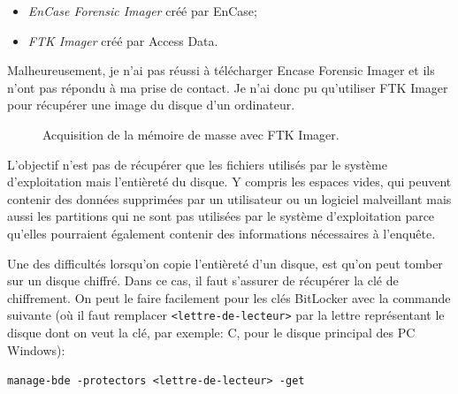 \begin{itemize}
    \item \textit{EnCase Forensic Imager} créé par EnCase;
    \item \textit{FTK Imager} créé par Access Data.
\end{itemize}

Malheureusement, je n'ai pas réussi à télécharger Encase Forensic Imager et ils n'ont pas répondu à ma prise de contact. Je n'ai donc pu qu'utiliser FTK Imager pour récupérer une image du disque d'un ordinateur.

\begin{figure}
    \centering
    \caption{Acquisition de la mémoire de masse avec FTK Imager.}
    \label{fig:ftk-imager}
\end{figure}

L'objectif n'est pas de récupérer que les fichiers utilisés par le système d'exploitation mais l'entièreté du disque. Y compris les espaces vides, qui peuvent contenir des données supprimées par un utilisateur ou un logiciel malveillant mais aussi les partitions qui ne sont pas utilisées par le système d'exploitation parce qu'elles pourraient également contenir des informations nécessaires à l'enquête.

Une des difficultés lorsqu'on copie l'entièreté d'un disque, est qu'on peut tomber sur un disque chiffré. Dans ce cas, il faut s'assurer de récupérer la clé de chiffrement. On peut le faire facilement pour les clés BitLocker avec la commande suivante (où il faut remplacer \texttt{<lettre-de-lecteur>} par la lettre représentant le disque dont on veut la clé, par exemple: C, pour le disque principal des PC Windows): \cite{11}

\texttt{manage-bde -protectors <lettre-de-lecteur> -get}










